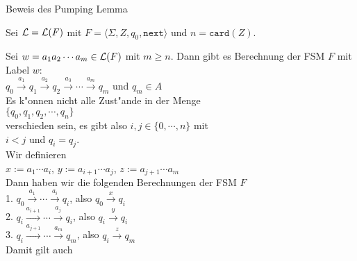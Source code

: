 
\begin{slide}{}
\normalsize

\begin{center}
Beweis des Pumping Lemma
\end{center}

\footnotesize
Sei ${\cal L} = {\cal L}(F)$ mit \quad  $F = \langle \Sigma, Z, q_0, \mathtt{next} \rangle$ und $n = \mathtt{card}(Z)$.

Sei $w = a_1a_2 \cdots a_m \in {\cal L}(F)$ mit $m \geq n$.  Dann gibt es Berechnung der FSM $F$ mit Label $w$:
\\[0.3cm]
\hspace*{1.3cm} 
  $q_0 \stackrel{a_1}{\rightarrow} q_1 \stackrel{a_2}{\rightarrow} q_2 \stackrel{a_3}{\rightarrow} \cdots \stackrel{a_m}{\rightarrow} q_m$ \quad und $q_m \in A$ 
  \\[0.3cm]
Es k"onnen nicht alle Zust"ande in der Menge \\[0.3cm]
\hspace*{1.3cm} $\{q_0, q_1, q_2, \cdots, q_n\}$ \\[0.3cm]
verschieden sein, es gibt also $i,j \in \{0,\cdots,n\}$ mit \\[0.3cm]
\hspace*{1.3cm} $i < j$ \quad und \quad $q_i = q_j$. \\[0.3cm]
Wir definieren \\[0.3cm]
\hspace*{1.3cm} $x := a_1 \cdots a_i$, \quad $y := a_{i+1} \cdots a_j$, \quad 
                $z := a_{j+1} \cdots a_m$ \\[0.3cm]
Dann haben wir die folgenden Berechnungen der FSM $F$ \\[0.3cm]
\hspace*{1.3cm} 1. $q_0 \stackrel{a_1}{\rightarrow} \cdots \stackrel{a_i}{\rightarrow} q_i$, also $q_0 \stackrel{x}{\rightarrow} q_i$ \\[0.3cm] 
\hspace*{1.3cm} 2. $q_i \stackrel{a_{i+1}}{\rightarrow} \cdots \stackrel{a_j}{\rightarrow} q_i$, also $q_i \stackrel{y}{\rightarrow} q_i$ \\[0.3cm] 
\hspace*{1.3cm} 3. $q_i \stackrel{a_{j+1}}{\rightarrow} \cdots \stackrel{a_m}{\rightarrow} q_m$, also $q_i \stackrel{z}{\rightarrow} q_m$ \\[0.3cm] 
Damit gilt auch \\[0.3cm]

\end{slide}
